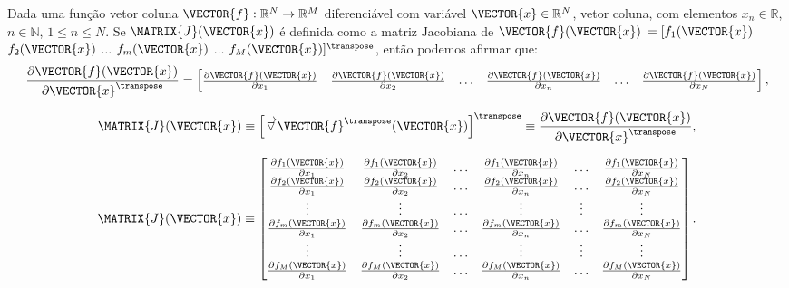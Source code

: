 \begin{proposition}\label{def:jacobian}
 Dada uma função vetor coluna $\VECTOR{f}:\mathbb{R}^{N}\rightarrow \mathbb{R}^{M}$ 
diferenciável com variável $\VECTOR{x} \in \mathbb{R}^{N}$, vetor coluna,
com elementos $x_n\in \mathbb{R}$, $n\in \mathbb{N}$, $1 \leq n \leq N$.
 Se $\MATRIX{J}(\VECTOR{x})$ é definida como a matriz Jacobiana \cite[pp. 130]{zhang2017matrix} \cite{Jacobian}  de 
 $\VECTOR{f}(\VECTOR{x})$
$=[f_1(\VECTOR{x})$ $f_2(\VECTOR{x})$ $\dots$ $f_m(\VECTOR{x})$ $\dots$ $f_M(\VECTOR{x})]^{\transpose}$, 
então podemos afirmar que: 
 \begin{equation}
   \frac{\partial \VECTOR{f}(\VECTOR{x})}{\partial \VECTOR{x}^{\transpose} }=
\left[
\begin{matrix}
\frac{\partial \VECTOR{f}(\VECTOR{x}) }{\partial x_{1}}&
\frac{\partial \VECTOR{f}(\VECTOR{x}) }{\partial x_{2}}&
\hdots&
\frac{\partial \VECTOR{f}(\VECTOR{x}) }{\partial x_{n}}&
\hdots&
\frac{\partial \VECTOR{f}(\VECTOR{x}) }{\partial x_{N}}
\end{matrix}
\right],
 \end{equation}

\begin{equation}
\MATRIX{J}(\VECTOR{x})\equiv
\left[\overrightarrow{\triangledown} \VECTOR{f}^{\transpose}(\VECTOR{x})\right]^{\transpose} \equiv 
\frac{\partial \VECTOR{f}(\VECTOR{x})}{\partial \VECTOR{x}^{\transpose} },
\end{equation}

  \begin{equation}
  \MATRIX{J}(\VECTOR{x})\equiv 
\left[
\begin{matrix}
\frac{\partial f_1(\VECTOR{x}) }{\partial x_{1}}&
\frac{\partial f_1(\VECTOR{x}) }{\partial x_{2}}&
\hdots&
\frac{\partial f_1(\VECTOR{x}) }{\partial x_{n}}&
\hdots&
\frac{\partial f_1(\VECTOR{x}) }{\partial x_{N}}\\
\frac{\partial f_2(\VECTOR{x}) }{\partial x_{1}}&
\frac{\partial f_2(\VECTOR{x}) }{\partial x_{2}}&
\hdots&
\frac{\partial f_2(\VECTOR{x}) }{\partial x_{n}}&
\hdots&
\frac{\partial f_2(\VECTOR{x}) }{\partial x_{N}}\\
\vdots&
\vdots&
\hdots&
\vdots&
\vdots&
\vdots\\
\frac{\partial f_m(\VECTOR{x}) }{\partial x_{1}}&
\frac{\partial f_m(\VECTOR{x}) }{\partial x_{2}}&
\hdots&
\frac{\partial f_m(\VECTOR{x}) }{\partial x_{n}}&
\hdots&
\frac{\partial f_m(\VECTOR{x}) }{\partial x_{N}}\\
\vdots&
\vdots&
\hdots&
\vdots&
\vdots&
\vdots\\
\frac{\partial f_M(\VECTOR{x}) }{\partial x_{1}}&
\frac{\partial f_M(\VECTOR{x}) }{\partial x_{2}}&
\hdots&
\frac{\partial f_M(\VECTOR{x}) }{\partial x_{n}}&
\hdots&
\frac{\partial f_M(\VECTOR{x}) }{\partial x_{N}}\\
\end{matrix}
\right].
 \end{equation}
\end{proposition}

